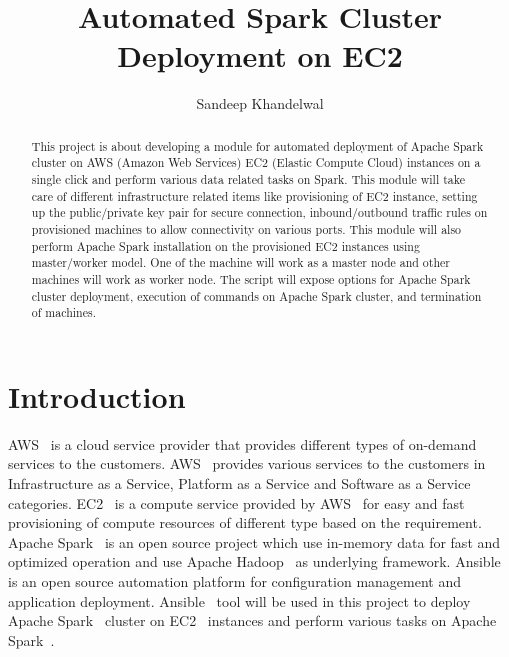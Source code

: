 
\title{Automated Spark Cluster Deployment on EC2}


\author{Sandeep Khandelwal}


\renewcommand{\shortauthors}{Sandeep}


\begin{abstract}

This project is about developing a module for automated deployment of
Apache Spark cluster on AWS (Amazon Web
Services) EC2 (Elastic Compute
Cloud) instances on a single click and perform various data related tasks on Spark. This
module will take care of different infrastructure related items like
provisioning of EC2 instance, setting up
the public/private key pair for secure connection, inbound/outbound
traffic rules on provisioned machines to allow connectivity on various
ports. This module will also perform Apache Spark installation on the provisioned
EC2 instances using master/worker model. One of the machine will work as a
master node and other machines will work as worker node. The script will expose 
options for Apache Spark cluster deployment, execution of commands on Apache
Spark cluster, and termination of machines.

\end{abstract}



\maketitle

\section{Introduction}

AWS~\cite{hid-sp18-511-www-aws} is a cloud service provider that
provides different types of on-demand services to the
customers. AWS~\cite{hid-sp18-511-www-aws} provides various services
to the customers in Infrastructure as a Service, Platform as a Service
and Software as a Service categories. EC2~\cite{hid-sp18-511-www-ec2}
is a compute service provided by AWS~\cite{hid-sp18-511-www-aws} for
easy and fast provisioning of compute resources of different type
based on the requirement. Apache Spark~\cite{hid-sp18-511-www-spark}
is an open source project which use in-memory data for fast and
optimized operation and use Apache
Hadoop~\cite{hid-sp18-511-www-hadoop} as underlying
framework. Ansible~\cite{hid-sp18-511-www-ansible} is an open source
automation platform for configuration management and application
deployment. Ansible~\cite{hid-sp18-511-www-ansible} tool will be used
in this project to deploy Apache Spark~\cite{hid-sp18-511-www-spark}
cluster on EC2~\cite{hid-sp18-511-www-ec2} instances and perform
various tasks on Apache Spark~\cite{hid-sp18-511-www-spark}.

